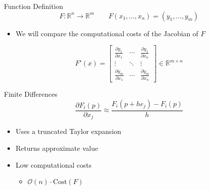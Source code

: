 \documentclass{beamer}
\begin{document}
\begin{frame}{Function Definition}
    \begin{equation*}
            F: \mathbb{R}^n \longrightarrow \mathbb{R}^m \qquad
            F(x_1, \ldots, x_n) = (y_1, \ldots, y_m)
    \end{equation*}

    \begin{itemize}
        \item We will compare the computational costs of the Jacobian of $F$
    \end{itemize}
    
    \begin{equation*} \label{jacobian}
        F'(x) = \begin{bmatrix}
            \frac{\partial y_1}{\partial x_1} & \cdots & \frac{\partial y_1}{\partial x_n} \\
            \vdots & \ddots & \vdots \\
            \frac{\partial y_m}{\partial x_1} & \cdots & \frac{\partial y_m}{\partial x_n}
        \end{bmatrix} \in \mathbb{R}^{m \times n}
    \end{equation*}
\end{frame}


\begin{frame}{Finite Differences}
    \begin{equation*}
        \frac{\partial F_i (p)}{\partial x_j} \approx \frac{F_i(p+he_j) - F_i(p)}{h}
    \end{equation*}
    \begin{itemize}
        \item Uses a truncated Taylor expansion 
        \item Returns \alert{approximate} value
        \item Low computational costs
        \begin{itemize}
            \item $\mathcal{O}(n) \cdot \mathrm{Cost}(F)$
        \end{itemize}
    \end{itemize}
\end{frame}
\end{document}
